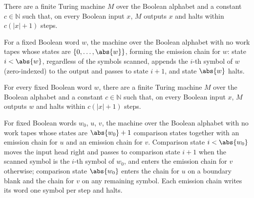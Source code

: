 \begin{theorem}
\label{Turing.FinTM.computesFunInTime_id}
\leanok
{}
There are a finite Turing machine $M$ over the Boolean alphabet and a constant
$c\in\mathbb{N}$ such that, on every Boolean input $x$, $M$ outputs $x$ and halts within
$c(|x|+1)$ steps.
\end{theorem}

\begin{definition}
\label{Turing.FinTM.constTM}
\leanok
{}
For a fixed Boolean word $w$, the machine over the Boolean alphabet with no
work tapes whose states are $\{0, \dots, \abs{w}\}$, forming the emission chain
for $w$: state $i < \abs{w}$, regardless of the symbols scanned, appends the
$i$-th symbol of $w$ (zero-indexed) to the output and passes to state $i + 1$,
and state $\abs{w}$ halts.
\end{definition}

\begin{theorem}
\label{Turing.FinTM.computesFunInTime_const}
\leanok
{}
For every fixed Boolean word $w$, there are a finite Turing machine $M$ over the Boolean
alphabet and a constant $c\in\mathbb{N}$ such that, on every Boolean input $x$, $M$
outputs $w$ and halts within $c(|x|+1)$ steps.
\end{theorem}

\begin{definition}
\label{Turing.FinTM.ifEqTM}
\leanok
{}
For fixed Boolean words $w_0$, $u$, $v$, the machine over the Boolean alphabet
with no work tapes whose states are $\abs{w_0} + 1$ comparison states together
with an emission chain for $u$ and an emission chain for $v$.  Comparison state
$i < \abs{w_0}$ moves the input head right and passes to comparison state
$i + 1$ when the scanned symbol is the $i$-th symbol of $w_0$, and enters the
emission chain for $v$ otherwise; comparison state $\abs{w_0}$ enters the
chain for $u$ on a boundary blank and the chain for $v$ on any remaining
symbol.  Each emission chain writes its word one symbol per step and halts.
\end{definition}

